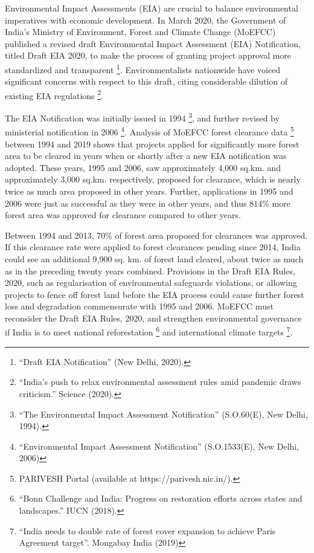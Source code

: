 Environmental Impact Assessments (EIA) are crucial to balance environmental imperatives with economic development.  
In March 2020, the Government of India's Ministry of Environment, Forest and Climate Change (MoEFCC) published a revised draft Environmental Impact Assessment (EIA) Notification, titled Draft EIA 2020, to make the process of granting project approval more standardized and transparent \footnote{``Draft EIA Notification'' (New Delhi, 2020).}. 
Environmentalists nationwide have voiced significant concerns with respect to this draft, citing considerable dilution of existing EIA regulations \footnote{``India's push to relax environmental assessment rules amid pandemic draws criticism.'' Science (2020).}. 

The EIA Notification was initially issued in 1994 \footnote{``The Environmental Impact Assessment Notification'' (S.O.60(E), New Delhi, 1994).}, and further revised by ministerial notification in 2006 \footnote{``Environmental Impact Assessment Notification'' (S.O.1533(E), New Delhi, 2006)}. 
Analysis of MoEFCC forest clearance data \footnote{PARIVESH Portal (available at https://parivesh.nic.in/).} between 1994 and 2019 shows that projects applied for significantly more forest area to be cleared in years when or shortly after a new EIA notification was adopted. 
These years, 1995 and 2006, saw approximately 4,000 sq.km. and approximately 3,000 sq.km. respectively, proposed for clearance, which is nearly twice as much area proposed in other years. 
Further, applications in 1995 and 2006 were just as successful as they were in other years, and thus 814\% more forest area was approved for clearance compared to other years.

Between 1994 and 2013, 70\% of forest area proposed for clearances was approved. 
If this clearance rate were applied to forest clearances pending since 2014, India could see an additional 9,900 sq. km. of forest land cleared, about twice as much as in the preceding twenty years combined. 
Provisions in the Draft EIA Rules, 2020, such as regularisation of environmental safeguards violations, or allowing projects to fence off forest land before the EIA process could cause further forest loss and degradation commensurate with 1995 and 2006. 
MoEFCC must reconsider the Draft EIA Rules, 2020, and strengthen environmental governance if India is to meet national reforestation \footnote{``Bonn Challenge and India: Progress on restoration efforts across states and landscapes.'' IUCN (2018).} and international climate targets \footnote{``India needs to double rate of forest cover expansion to achieve Paris Agreement target''. Mongabay India (2019)}.


{ \begin{center}  \end{center} }

\endgroup

\afterpage{\nopagecolor}
\pagestyle{scrheadings}
